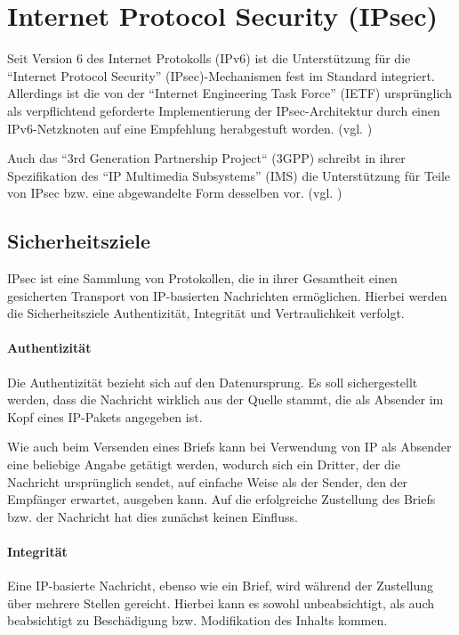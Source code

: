 \section{Internet Protocol Security (IPsec)}

Seit Version 6 des Internet Protokolls (IPv6) ist die Unterstützung für die “Internet Protocol Security” (IPsec)-Mechanismen fest im Standard integriert. Allerdings ist die von der “Internet Engineering Task Force” (IETF) ursprünglich als verpflichtend geforderte Implementierung der IPsec-Archi\-tek\-tur durch einen IPv6-Netzknoten auf eine Empfehlung herabgestuft worden. (vgl. \cite{RFC6434})

Auch das “3rd Generation Partnership Project“ (3GPP) schreibt in ihrer Spezifikation des “IP Multimedia Subsystems” (IMS) die Unterstützung für Teile von IPsec bzw. eine abgewandelte Form desselben vor. (vgl. \cite{TS33.210})

\subsection{Sicherheitsziele}
IPsec ist eine Sammlung von Protokollen, die in ihrer Gesamtheit einen gesicherten Transport von IP-basierten Nachrichten ermöglichen. Hierbei werden die Sicherheitsziele Authentizität, Integrität und Vertraulichkeit verfolgt.

\paragraph{Authentizität}
Die Authentizität bezieht sich auf den Datenursprung. Es soll sichergestellt werden, dass die Nachricht wirklich aus der Quelle stammt, die als Absender im Kopf eines IP-Pakets angegeben ist.

Wie auch beim Versenden eines Briefs kann bei Verwendung von IP als Absender eine beliebige Angabe getätigt werden, wodurch sich ein Dritter, der die Nachricht ursprünglich sendet, auf einfache Weise als der Sender, den der Empfänger erwartet, ausgeben kann. Auf die erfolgreiche Zustellung des Briefs bzw. der Nachricht hat dies zunächst keinen Einfluss.

\paragraph{Integrität}
Eine IP-basierte Nachricht, ebenso wie ein Brief, wird während der Zustellung über mehrere Stellen gereicht. Hierbei kann es sowohl unbeabsichtigt, als auch beabsichtigt zu Beschädigung bzw. Modifikation des Inhalts kommen.

